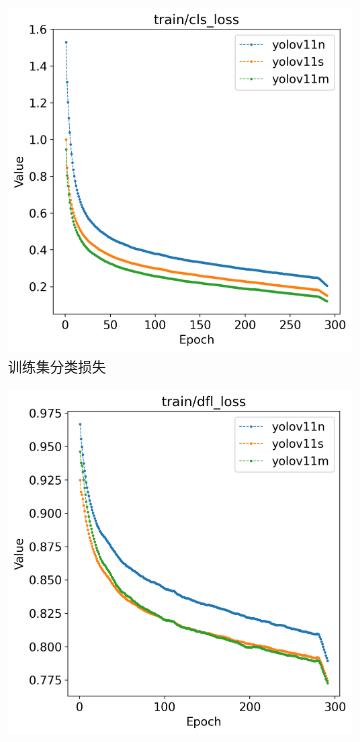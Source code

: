 \begin{figure}[H]
\begin{subfigure}[t]{0.43\textwidth}
        \includegraphics[width=\textwidth]{figs/chap04/helmet_result/helmet_train_cls_loss.png}
        \caption{训练集分类损失}
        \label{fig:helmet_train_cls_loss}
    \end{subfigure}
    \begin{subfigure}[t]{0.43\textwidth}
        \centering
        \includegraphics[width=\textwidth]{figs/chap04/helmet_result/helmet_train_dfl_loss.png}

\end{subfigure}
\end{figure}

